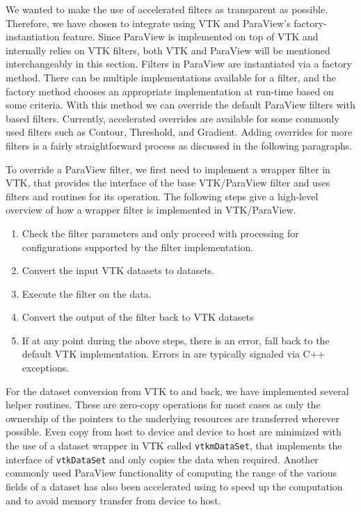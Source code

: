 We wanted to make the use of \vtkm accelerated filters as transparent as possible. Therefore, we have chosen to integrate \vtkm using VTK and ParaView's factory-instantiation feature. Since ParaView is implemented on top of VTK and internally relies on VTK filters, both VTK and ParaView will be mentioned interchangeably in this section. Filters in ParaView are instantiated via a factory method. There can be multiple implementations available for a filter, and the factory method chooses an appropriate implementation at run-time based on some criteria. With this method we can override the default ParaView filters with \vtkm based filters. Currently, \vtkm accelerated overrides are available for some commonly used filters such as Contour, Threshold, and Gradient. Adding overrides for more filters is a fairly straightforward process as discussed in the following paragraphs.

To override a ParaView filter, we first need to implement a \vtkm wrapper filter in VTK, that provides the interface of the base VTK/ParaView filter and uses \vtkm filters and routines for its operation. The following steps give a high-level overview of how a \vtkm wrapper filter is implemented in VTK/ParaView.
\begin{enumerate}
    \item Check the filter parameters and only proceed with \vtkm processing for configurations supported by the \vtkm filter implementation.
    \item Convert the input VTK datasets to \vtkm datasets. 
    \item Execute the \vtkm filter on the data.
    \item Convert the output of the \vtkm filter back to VTK datasets
    \item If at any point during the above steps, there is an error, fall back to the default VTK implementation. Errors in \vtkm are typically signaled via C++ exceptions.
\end{enumerate}

For the dataset conversion from VTK to \vtkm and back, we have implemented several helper routines. These are zero-copy operations for most cases as only the ownership of the pointers to the underlying resources are transferred wherever possible. Even copy from host to device and device to host are minimized with the use of a \vtkm dataset wrapper in VTK called \texttt{vtkmDataSet}, that implements the interface of \texttt{vtkDataSet} and only copies the data when required. Another commonly used ParaView functionality of computing the range of the various fields of a dataset has also been accelerated using \vtkm to speed up the computation and to avoid memory transfer from device to host.

